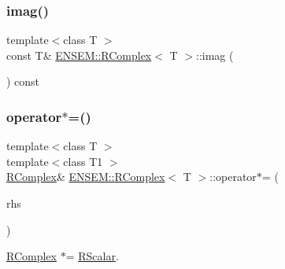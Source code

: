 \mbox{\label{classENSEM_1_1RComplex_a8df643a2ba06dc851d19eb35cd4c4cde}} 
\subsubsection{\texorpdfstring{imag()}{imag()}\hspace{0.1cm}{\footnotesize\ttfamily [4/4]}}
{\footnotesize\ttfamily template$<$class T $>$ \\
const T\& \mbox{\hyperlink{classENSEM_1_1RComplex}{E\+N\+S\+E\+M\+::\+R\+Complex}}$<$ T $>$\+::imag (\begin{DoxyParamCaption}{ }\end{DoxyParamCaption}) const\hspace{0.3cm}{\ttfamily [inline]}}

\mbox{\label{classENSEM_1_1RComplex_aaf2adc526cdbb0b29931b21311cd74fe}} 
\subsubsection{\texorpdfstring{operator$\ast$=()}{operator*=()}\hspace{0.1cm}{\footnotesize\ttfamily [1/4]}}
{\footnotesize\ttfamily template$<$class T $>$ \\
template$<$class T1 $>$ \\
\mbox{\hyperlink{classENSEM_1_1RComplex}{R\+Complex}}\& \mbox{\hyperlink{classENSEM_1_1RComplex}{E\+N\+S\+E\+M\+::\+R\+Complex}}$<$ T $>$\+::operator$\ast$= (\begin{DoxyParamCaption}\item[{const \mbox{\hyperlink{classENSEM_1_1RScalar}{R\+Scalar}}$<$ T1 $>$ \&}]{rhs }\end{DoxyParamCaption})\hspace{0.3cm}{\ttfamily [inline]}}



\mbox{\hyperlink{classENSEM_1_1RComplex}{R\+Complex}} $\ast$= \mbox{\hyperlink{classENSEM_1_1RScalar}{R\+Scalar}}. 


